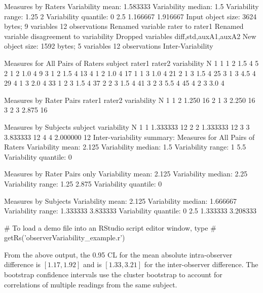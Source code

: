 \begin{Schunk}
\begin{Soutput}
Measures by Raters
Variability mean:  1.583333 
Variability median:  1.5 
Variability range:  1.25 2 
Variability quantile: 
0%:  1.25   25%:  1.375   50%:  1.5   75%:  1.75   100%:  2 
    2.5%    97.5% 
1.166667 1.916667 
Input object size:	 3624 bytes;	 9 variables	 12 observations
Renamed variable	 rater 	to rater1 
Renamed variable	 disagreement 	to variability 
Dropped variables	diff,std,auxA1,auxA2
New object size:	1592 bytes;	5 variables	12 observations
Inter-Variability 

Measures for All Pairs of Raters
   subject rater1 rater2 variability N
1        1      1      2         1.5 4
5        2      1      2         1.0 4
9        3      1      2         1.5 4
13       4      1      2         1.0 4
17       1      1      3         1.0 4
21       2      1      3         1.5 4
25       3      1      3         4.5 4
29       4      1      3         2.0 4
33       1      2      3         1.5 4
37       2      2      3         1.5 4
41       3      2      3         5.5 4
45       4      2      3         3.0 4

Measures by Rater Pairs
  rater1 rater2 variability  N
1      1      2       1.250 16
2      1      3       2.250 16
3      2      3       2.875 16

Measures by Subjects
  subject variability  N
1       1    1.333333 12
2       2    1.333333 12
3       3    3.833333 12
4       4    2.000000 12
Inter-variability summary:
Measures for All Pairs of Raters
Variability mean:  2.125 
Variability median:  1.5 
Variability range:  1 5.5 
Variability quantile: 
0%:  1   25%:  1.375   50%:  1.5   75%:  2.25   100%:  5.5 

Measures by Rater Pairs only
Variability mean:  2.125 
Variability median:  2.25 
Variability range:  1.25 2.875 
Variability quantile: 
0%:  1.25   25%:  1.75   50%:  2.25   75%:  2.5625   100%:  2.875 

Measures by Subjects
Variability mean:  2.125 
Variability median:  1.666667 
Variability range:  1.333333 3.833333 
Variability quantile: 
0%:  1.333333   25%:  1.333333   50%:  1.666667   75%:  2.458333   100%:  3.833333 
    2.5%    97.5% 
1.333333 3.208333 
\end{Soutput}
\begin{Sinput}
# To load a demo file into an RStudio script editor window, type
# getRs('observerVariability_example.r')
\end{Sinput}
\end{Schunk}
From the above output, the 0.95 CL for the mean absolute
intra-observer difference is $[1.17, 1.92]$ and is $[1.33, 3.21]$ for the
inter-observer difference.  The bootstrap confidence intervals use the
cluster bootstrap to account for correlations of multiple readings
from the same subject.

